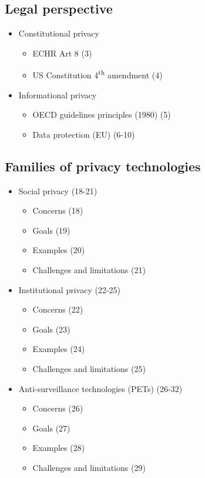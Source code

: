 \documentclass[../overview.tex]{subfiles}
\begin{document}
\subsection{Legal perspective}
\begin{itemize}
	\item Constitutional privacy
	\begin{itemize}
		\item ECHR Art 8 (3)
		\item US Constitution 4\textsuperscript{th} amendment (4)
	\end{itemize}

	\item Informational privacy
	\begin{itemize}
		\item OECD guidelines principles (1980) (5)
		\item Data protection (EU) (6-10)
	\end{itemize}
\end{itemize}

\subsection{Families of privacy technologies}
\begin{itemize}
	\item Social privacy (18-21)
	\begin{itemize}
		\item Concerns (18)
		\item Goals (19)
		\item Examples (20)
		\item Challenges and limitations (21)
	\end{itemize}
	\item Institutional privacy (22-25)
	\begin{itemize}
		\item Concerns (22) 
		\item Goals (23)
		\item Examples (24)
		\item Challenges and limitations (25)
	\end{itemize}
	\item Anti-surveillance technologies (PETs) (26-32)
	\begin{itemize}
		\item Concerns (26) 
		\item Goals (27)
		\item Examples (28)
		\item Challenges and limitations (29)
	\end{itemize}
\end{itemize}
\end{document}

